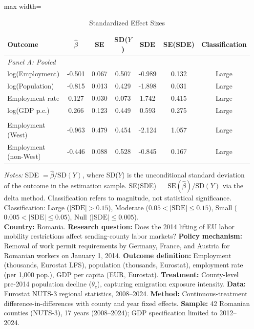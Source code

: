 \begin{table}[htbp]
\centering
\caption{Standardized Effect Sizes}
\label{tab:sde}
\begin{adjustbox}{max width=\textwidth}
\begin{tabular}{lcccccc}
\toprule
Outcome & $\hat{\beta}$ & SE & SD($Y$) & SDE & SE(SDE) & Classification \\
\midrule
\multicolumn{7}{l}{\textit{Panel A: Pooled}} \\
\addlinespace
log(Employment) & -0.501 & 0.067 & 0.507 & -0.989 & 0.132 & Large \\
log(Population) & -0.815 & 0.013 & 0.429 & -1.898 & 0.031 & Large \\
Employment rate & 0.127 & 0.030 & 0.073 & 1.742 & 0.415 & Large \\
log(GDP p.c.) & 0.266 & 0.123 & 0.449 & 0.593 & 0.275 & Large \\
\addlinespace
\multicolumn{7}{l}{\textit{Panel B: Heterogeneous (Employment)}} \\
\addlinespace
Employment (West) & -0.963 & 0.479 & 0.454 & -2.124 & 1.057 & Large \\
Employment (non-West) & -0.446 & 0.088 & 0.528 & -0.845 & 0.167 & Large \\
\bottomrule
\end{tabular}
\end{adjustbox}
\begin{flushleft}\small
\textit{Notes:} SDE $= \hat{\beta} / \text{SD}(Y)$, where SD($Y$) is the unconditional standard deviation of the outcome in the estimation sample. SE(SDE) $= \text{SE}(\hat{\beta}) / \text{SD}(Y)$ via the delta method. Classification refers to magnitude, not statistical significance. Classification: Large ($|\text{SDE}| > 0.15$), Moderate ($0.05 < |\text{SDE}| \leq 0.15$), Small ($0.005 < |\text{SDE}| \leq 0.05$), Null ($|\text{SDE}| \leq 0.005$). \\[3pt]\textbf{Country:} Romania. \textbf{Research question:} Does the 2014 lifting of EU labor mobility restrictions affect sending-county labor markets? \textbf{Policy mechanism:} Removal of work permit requirements by Germany, France, and Austria for Romanian workers on January 1, 2014. \textbf{Outcome definition:} Employment (thousands, Eurostat LFS), population (thousands, Eurostat), employment rate (per 1,000 pop.), GDP per capita (EUR, Eurostat). \textbf{Treatment:} County-level pre-2014 population decline ($\theta_c$), capturing emigration exposure intensity. \textbf{Data:} Eurostat NUTS-3 regional statistics, 2008--2024. \textbf{Method:} Continuous-treatment difference-in-differences with county and year fixed effects. \textbf{Sample:} 42 Romanian counties (NUTS-3), 17 years (2008--2024); GDP specification limited to 2012--2024.
\end{flushleft}
\end{table}
